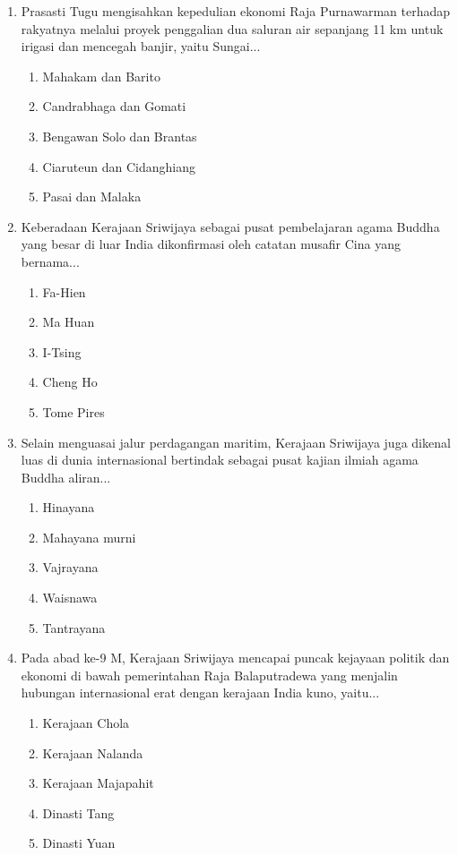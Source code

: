 \documentclass[12pt, a4paper]{article}
\begin{document}
\begin{enumerate}[label=\arabic*.]
    \item Prasasti Tugu mengisahkan kepedulian ekonomi Raja Purnawarman terhadap rakyatnya melalui proyek penggalian dua saluran air sepanjang 11 km untuk irigasi dan mencegah banjir, yaitu Sungai...
    \begin{enumerate}[label=\Alph*.]
        \item Mahakam dan Barito
        \item Candrabhaga dan Gomati
        \item Bengawan Solo dan Brantas
        \item Ciaruteun dan Cidanghiang
        \item Pasai dan Malaka
    \end{enumerate}

    \item Keberadaan Kerajaan Sriwijaya sebagai pusat pembelajaran agama Buddha yang besar di luar India dikonfirmasi oleh catatan musafir Cina yang bernama...
    \begin{enumerate}[label=\Alph*.]
        \item Fa-Hien
        \item Ma Huan
        \item I-Tsing
        \item Cheng Ho
        \item Tome Pires
    \end{enumerate}

    \item Selain menguasai jalur perdagangan maritim, Kerajaan Sriwijaya juga dikenal luas di dunia internasional bertindak sebagai pusat kajian ilmiah agama Buddha aliran...
    \begin{enumerate}[label=\Alph*.]
        \item Hinayana
        \item Mahayana murni
        \item Vajrayana
        \item Waisnawa
        \item Tantrayana
    \end{enumerate}

    \item Pada abad ke-9 M, Kerajaan Sriwijaya mencapai puncak kejayaan politik dan ekonomi di bawah pemerintahan Raja Balaputradewa yang menjalin hubungan internasional erat dengan kerajaan India kuno, yaitu...
    \begin{enumerate}[label=\Alph*.]
        \item Kerajaan Chola
        \item Kerajaan Nalanda
        \item Kerajaan Majapahit
        \item Dinasti Tang
        \item Dinasti Yuan
    \end{enumerate}


\end{enumerate}
\end{document}
